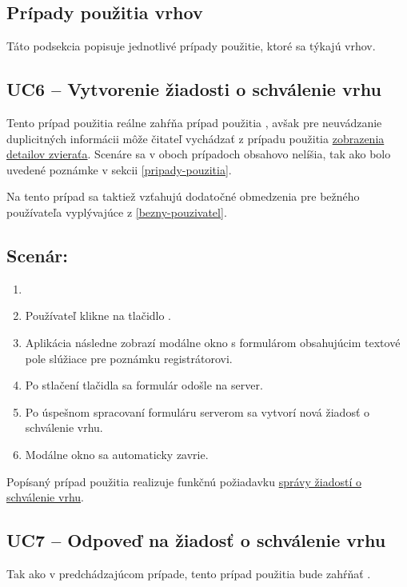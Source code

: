 \subsection{Prípady použitia vrhov}
Táto podsekcia popisuje jednotlivé prípady použitie, ktoré sa týkajú vrhov.

\subsection*{UC6 -- Vytvorenie žiadosti o schválenie vrhu}

Tento prípad použitia reálne zahŕňa prípad použitia , avšak pre neuvádzanie duplicitných informácii môže čitateľ vychádzať z prípadu použitia \hyperref[uc2]{zobrazenia detailov zvieraťa}. Scenáre sa v oboch prípadoch obsahovo nelíšia, tak ako bolo uvedené poznámke v sekcii \ref{pripady-pouzitia}.

Na tento prípad sa taktiež vzťahujú dodatočné obmedzenia pre bežného používateľa vyplývajúce z \ref{bezny-pouzivatel}.

\subsection*{Scenár:}

\begin{enumerate}
	\item {}
	\item Používateľ klikne na tlačidlo .
	\item Aplikácia následne zobrazí modálne okno s formulárom obsahujúcim textové pole slúžiace pre poznámku registrátorovi.
	\item Po stlačení tlačidla  sa formulár odošle na server.
	\item Po úspešnom spracovaní formuláru serverom sa vytvorí nová žiadosť o schválenie vrhu.
	\item Modálne okno sa automaticky zavrie.
\end{enumerate}

Popísaný prípad použitia realizuje funkčnú požiadavku \hyperref[sprava-ziadosti-o-schvalenie-vrhu]{správy žiadostí o schválenie vrhu}.

\subsection*{UC7 -- Odpoveď na žiadosť o schválenie vrhu}

Tak ako v predchádzajúcom prípade, tento prípad použitia bude zahŕňať .

